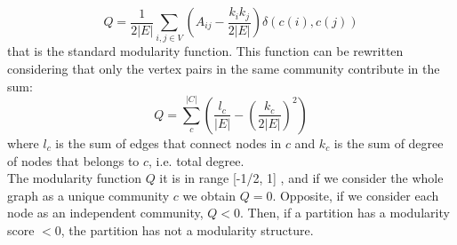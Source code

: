 \begin{equation}\label{ModularityExt}
Q = \frac{1}{2|E|} \sum_{i,j \in V}\left(A_{ij} - \frac{k_ik_j}{2|E|}\right) \delta(c(i), c(j))
\end{equation}
that is the standard modularity function. This function can be rewritten considering that only the vertex pairs in the same community contribute in the sum: 
\begin{equation}\label{ModularityC}
Q =  \sum_{c}^{|C|} \left( \frac{l_c}{|E|} - \left( \frac{k_c}{2|E|}\right) ^2 \right)
\end{equation}
where $l_c$ is the sum of edges that connect nodes in $c$ and $k_c$ is the sum of degree of nodes that belongs to $c$, i.e. total degree. \\
The modularity function $Q$ it is in range [-1/2, 1] \cite{bounds}, and if we consider the whole graph as a unique community $c$ we obtain $Q = 0$. Opposite, if we consider each node as an independent community, $Q < 0$. Then, if a partition has a modularity score $<0$, the partition has not a modularity structure. 
